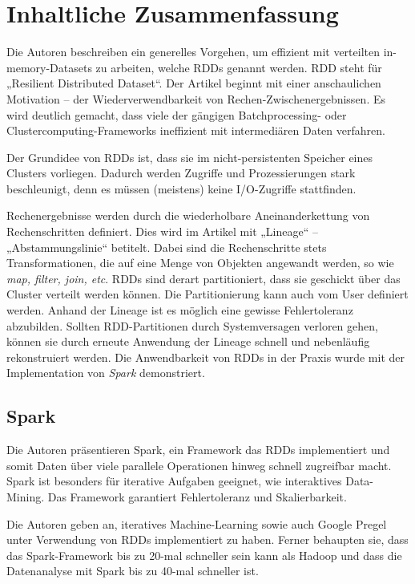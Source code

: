 \section{Inhaltliche Zusammenfassung}


Die Autoren beschreiben ein generelles Vorgehen, um effizient mit verteilten in-memory-Datasets zu arbeiten, welche RDDs genannt werden. RDD steht für „Resilient Distributed Dataset“. Der Artikel beginnt mit einer anschaulichen Motivation -- der Wiederverwendbarkeit von Rechen-Zwischenergebnissen. Es wird deutlich gemacht, dass viele der gängigen Batchprocessing- oder Clustercomputing-Frameworks ineffizient mit intermediären Daten verfahren.

Der Grundidee von RDDs ist, dass sie im nicht-persistenten Speicher eines Clusters vorliegen. Dadurch werden Zugriffe und Prozessierungen stark beschleunigt, denn es müssen (meistens) keine I/O-Zugriffe stattfinden. 

Rechenergebnisse werden durch die wiederholbare Aneinanderkettung von Rechenschritten definiert. Dies wird im Artikel mit „Lineage“ -- „Abstammungslinie“ betitelt. Dabei sind die Rechenschritte stets Transformationen, die auf eine Menge von Objekten angewandt werden, so wie \textit{map, filter, join, etc}. RDDs sind derart partitioniert, dass sie geschickt über das Cluster verteilt werden können. Die Partitionierung kann auch vom User definiert werden. Anhand der Lineage ist es möglich eine gewisse Fehlertoleranz abzubilden. Sollten RDD-Partitionen durch Systemversagen verloren gehen, können sie durch erneute Anwendung der Lineage schnell und nebenläufig rekonstruiert werden. Die Anwendbarkeit von RDDs in der Praxis wurde mit der Implementation von \textit{Spark} demonstriert.

\subsection{Spark}

Die Autoren präsentieren Spark, ein Framework das RDDs implementiert und somit Daten über viele parallele Operationen hinweg schnell zugreifbar macht. Spark ist besonders für iterative Aufgaben geeignet, wie interaktives Data-Mining. Das Framework garantiert Fehlertoleranz und Skalierbarkeit.

Die Autoren geben an, iteratives Machine-Learning sowie auch Google Pregel unter Verwendung von RDDs implementiert zu haben. Ferner behaupten sie, dass das Spark-Framework bis zu 20-mal schneller sein kann als Hadoop und dass die Datenanalyse mit Spark bis zu 40-mal schneller ist. 

